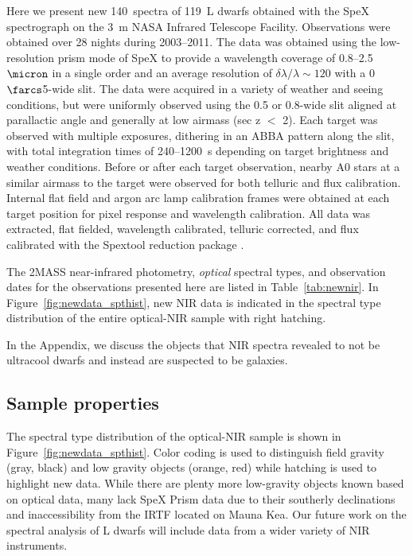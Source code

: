 \documentclass[12pt,preprint]{aastex}
\newcommand{\prismspectra}{140} %
\newcommand{\objects}{119} %
\begin{document}
Here we present new \prismspectra~spectra of \objects~L dwarfs obtained with the SpeX spectrograph \citep{Spex} on the 3~m NASA Infrared Telescope Facility. Observations were obtained over 28 nights during 2003--2011. The data was obtained using the low-resolution prism mode of SpeX to provide a wavelength coverage of 0.8--2.5~$\micron$ in a single order and an average resolution of $\delta\lambda/\lambda\sim120$ with a 0$\farcs$5-wide slit. The data were acquired in a variety of weather and seeing conditions, but were uniformly observed using the 0.5 or 0.8-wide slit aligned at parallactic angle and generally at low airmass (sec z $<$ 2). Each target was observed with multiple exposures, dithering in an ABBA pattern along the slit, with total integration times of 240--1200~s depending on target brightness and weather conditions. Before or after each target observation, nearby A0 stars at a similar airmass to the target were observed for both telluric and flux calibration. Internal flat field and argon arc lamp calibration frames were obtained at each target position for pixel response and wavelength calibration. All data was extracted, flat fielded, wavelength calibrated, telluric corrected, and flux calibrated with the Spextool reduction package \citep{Cushing04,Spextool2}. 

The 2MASS near-infrared photometry, \emph{optical} spectral types, and observation dates for the observations presented here are listed in Table~\ref{tab:newnir}. In Figure~\ref{fig:newdata_spthist}, new NIR data is indicated in the spectral type distribution of the entire optical-NIR sample with right hatching.

In the Appendix, we discuss the objects that NIR spectra revealed to not be ultracool dwarfs and instead are suspected to be galaxies.

\subsection{Sample properties}
The spectral type distribution of the optical-NIR sample is shown in Figure~\ref{fig:newdata_spthist}. Color coding is used to distinguish field gravity (gray, black) and low gravity objects (orange, red) while hatching is used to highlight new data.
While there are plenty more low-gravity objects known based on optical data, many lack SpeX Prism data due to their southerly declinations and inaccessibility from the IRTF located on Mauna Kea. Our future work on the spectral analysis of L dwarfs will include data from a wider variety of NIR instruments.
\end{document}
